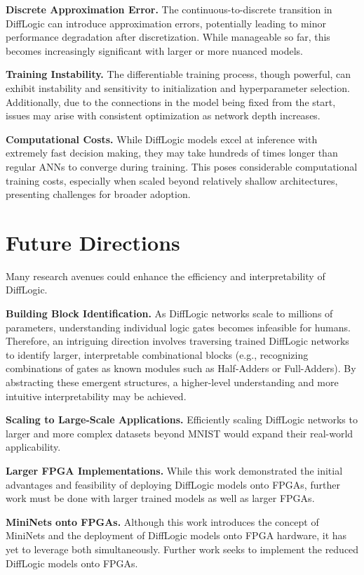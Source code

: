 \textbf{Discrete Approximation Error.} The continuous-to-discrete transition in DiffLogic can introduce approximation errors, potentially leading to minor performance degradation after discretization. While manageable so far, this becomes increasingly significant with larger or more nuanced models.

\textbf{Training Instability.} The differentiable training process, though powerful, can exhibit instability and sensitivity to initialization and hyperparameter selection. Additionally, due to the connections in the model being fixed from the start, issues may arise with consistent optimization as network depth increases.

\textbf{Computational Costs.} While DiffLogic models excel at inference with extremely fast decision making, they may take hundreds of times longer than regular ANNs to converge during training. This poses considerable computational training costs, especially when scaled beyond relatively shallow architectures, presenting challenges for broader adoption.

\section{Future Directions}
\label{sec:future_directions}

Many research avenues could enhance the efficiency and interpretability of DiffLogic.

\textbf{Building Block Identification.} As DiffLogic networks scale to millions of parameters, understanding individual logic gates becomes infeasible for humans. Therefore, an intriguing direction involves traversing trained DiffLogic networks to identify larger, interpretable combinational blocks (e.g., recognizing combinations of gates as known modules such as Half-Adders or Full-Adders). By abstracting these emergent structures, a higher-level understanding and more intuitive interpretability may be achieved.

\textbf{Scaling to Large-Scale Applications.} Efficiently scaling DiffLogic networks to larger and more complex datasets beyond MNIST would expand their real-world applicability.

\textbf{Larger FPGA Implementations.} While this work demonstrated the initial advantages and feasibility of deploying DiffLogic models onto FPGAs, further work must be done with larger trained models as well as larger FPGAs.

\textbf{MiniNets onto FPGAs.} Although this work introduces the concept of MiniNets and the deployment of DiffLogic models onto FPGA hardware, it has yet to leverage both simultaneously. Further work seeks to implement the reduced DiffLogic models onto FPGAs.

